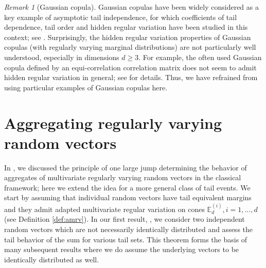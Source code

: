 \documentclass[aos]{imsart}
\numberwithin{equation}{section}
\theoremstyle{plain} %
\theoremstyle{remark}
\newtheorem{remark}[theorem]{Remark}
\newcommand{\E}{\mathbb{E}}
\begin{document}
\begin{remark}[Gaussian copula]
Gaussian copulas have been widely considered as a key example of asymptotic tail independence, for which coefficients of tail dependence, tail order and hidden regular variation have been studied in this context; see \cite{ledford:tawn:1996,hua:joe:li:2014,furman:kuznetsov:suzitikis:2016}. Surprisingly, the hidden regular variation properties of Gaussian copulas (with regularly varying marginal distributions) are not particularly well understood, especially in dimensions $d\ge 3$. For example, the often used Gaussian copula defined by an equi-correlation correlation matrix does not seem to admit hidden regular variation in general; see \cite{das:fasen:2022a} for details. Thus, we have refrained from using particular examples of Gaussian copulas here.
\end{remark}


\section{Aggregating regularly varying random vectors}\label{sec:mainresult}
In , we discussed the principle of one large jump determining the behavior of aggregates of multivariate regularly varying random vectors in the classical framework; here we extend the idea for a more general class of tail events. We start by assuming that individual random vectors have tail equivalent margins and they admit adapted multivariate regular variation  on cones $\E_d^{(i)}, i=1,\ldots, d$ (see Definition \ref{def:amrv}). In our first result, , we consider two independent random vectors which are not necessarily identically distributed and assess the tail behavior of the sum for various tail sets. This theorem forms the basis of many subsequent results where we do assume the underlying vectors to be identically distributed as well.
\end{document}
